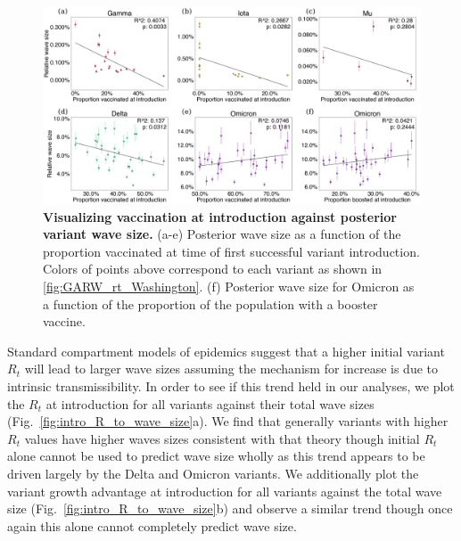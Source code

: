 \documentclass[11pt,oneside,letterpaper]{article}
\begin{document}
\begin{figure}[h!]
  \centering
  \includegraphics[width=\linewidth]{figs/vaccination_to_wave_size.png}
  \caption{\textbf{Visualizing vaccination at introduction against posterior variant wave size.}
  (a-e) Posterior wave size as a function of the proportion vaccinated at time of first successful variant introduction. Colors of points above correspond to each variant as shown in \ref{fig:GARW_rt_Washington}.
  (f) Posterior wave size for Omicron as a function of the proportion of the population with a booster vaccine.
}
  \label{fig:vaccination_to_wave_size}
\end{figure}

Standard compartment models of epidemics suggest that a higher initial variant $R_{t}$ will lead to larger wave sizes assuming the mechanism for increase is due to intrinsic transmissibility.
In order to see if this trend held in our analyses, we plot the $R_{t}$ at introduction for all variants against their total wave sizes (Fig.\ \ref{fig:intro_R_to_wave_size}a).
We find that generally variants with higher $R_{t}$ values have higher waves sizes consistent with that theory though initial $R_{t}$ alone cannot be used to predict wave size wholly as this trend appears to be driven largely by the Delta and Omicron variants.
We additionally plot the variant growth advantage at introduction for all variants against the total wave size (Fig.\ \ref{fig:intro_R_to_wave_size}b) and observe a similar trend though once again this alone cannot completely predict wave size.
\end{document}
